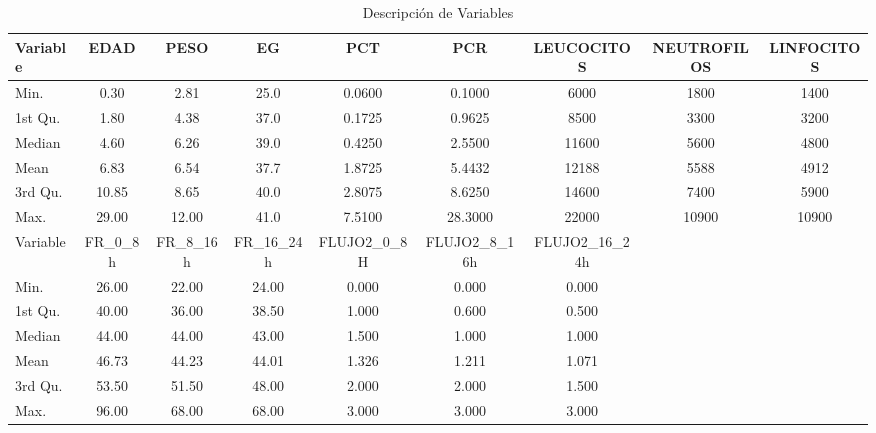 \newpage
\thispagestyle{empty}
\begin{landscape}
    \begin{table}[h]
        \centering
        \caption{Descripción de Variables}
        \begin{tabular}{lcccccccc}
        \hline
        Variable & EDAD & PESO & EG & PCT & PCR & LEUCOCITOS & NEUTROFILOS & LINFOCITOS \\ \hline
        Min. & 0.30 & 2.81 & 25.0 & 0.0600 & 0.1000 & 6000 & 1800 & 1400 \\
        1st Qu. & 1.80 & 4.38 & 37.0 & 0.1725 & 0.9625 & 8500 & 3300 & 3200 \\
        Median & 4.60 & 6.26 & 39.0 & 0.4250 & 2.5500 & 11600 & 5600 & 4800 \\
        Mean & 6.83 & 6.54 & 37.7 & 1.8725 & 5.4432 & 12188 & 5588 & 4912 \\
        3rd Qu. & 10.85 & 8.65 & 40.0 & 2.8075 & 8.6250 & 14600 & 7400 & 5900 \\
        Max. & 29.00 & 12.00 & 41.0 & 7.5100 & 28.3000 & 22000 & 10900 & 10900 \\ \hline
        Variable & FR\_0\_8h & FR\_8\_16h & FR\_16\_24h & FLUJO2\_0\_8H & FLUJO2\_8\_16h & FLUJO2\_16\_24h \\ \hline
        Min. & 26.00 & 22.00 & 24.00 & 0.000 & 0.000 & 0.000 \\
        1st Qu. & 40.00 & 36.00 & 38.50 & 1.000 & 0.600 & 0.500 \\
        Median & 44.00 & 44.00 & 43.00 & 1.500 & 1.000 & 1.000 \\
        Mean & 46.73 & 44.23 & 44.01 & 1.326 & 1.211 & 1.071 \\
        3rd Qu. & 53.50 & 51.50 & 48.00 & 2.000 & 2.000 & 1.500 \\
        Max. & 96.00 & 68.00 & 68.00 & 3.000 & 3.000 & 3.000 \\ \hline
        \end{tabular}
        \label{tab:datos_descripcion_cuantitativos}
    \end{table}
\end{landscape}
\restoregeometry 
    
